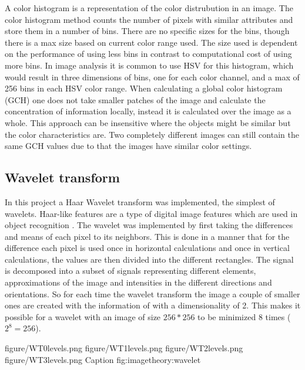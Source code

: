 A color histogram is a representation of the color distrubution in an image. The color histogram method counts the number of pixels with similar attributes and store them in a number of bins. There are no specific sizes for the bins, though there is a max size based on current color range used. The size used is dependent on the performance of using less bins in contrast to computational cost of using more bins. In image analysis it is common to use HSV for this histogram, which would result in three dimensions of bins, one for each color channel, and a max of 256 bins in each HSV color range. When calculating a global color histogram (GCH) one does not take smaller patches of the image and calculate the concentration of information locally, instead it is calculated over the image as a whole. This approach can be insensitive where the objects might be similar but the color characteristics are. Two completely different images can still contain the same GCH values due to that the images have similar color settings.


\subsection{Wavelet transform}
\label{sec:wlt_feature}

In this project a Haar Wavelet transform was implemented, the simplest of wavelets. Haar-like features are a type of digital image features which are used in object recognition \cite{pavani2010haar}. The wavelet was implemented by first taking the differences and means of each pixel to its neighbors. This is done in a manner that for the difference each pixel is used once in horizontal calculations and once in vertical calculations, the values are then divided into the different rectangles. The signal is decomposed into a subset of signals representing different elements, approximations of the image and intensities in the different directions and orientations. So for each time the wavelet transform the image a couple of smaller ones are created with the information of with a dimensionality of 2. This makes it possible for a wavelet with an image of size $256*256$ to be minimized 8 times ($2^8 = 256$).

\fourfigure
{figure/WT0levels.png}
{figure/WT1levels.png}
{figure/WT2levels.png}
{figure/WT3levels.png}
{Caption}
{fig:imagetheory:wavelet} 

